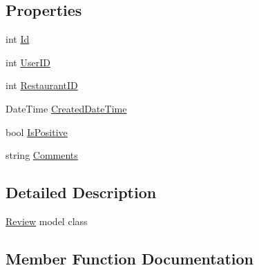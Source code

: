 \subsection*{Properties}
\begin{DoxyCompactItemize}
\item 
int \hyperlink{class_restaurant_reviews_1_1_data_1_1_review_a4226eaf109005a38ea25e2325759616e}{Id}
\item 
int \hyperlink{class_restaurant_reviews_1_1_data_1_1_review_a61b089604a847d3137f398e711c8fecd}{User\+ID}
\item 
int \hyperlink{class_restaurant_reviews_1_1_data_1_1_review_a7684403f30d07e4fc84a235940d9d5f1}{Restaurant\+ID}
\item 
Date\+Time \hyperlink{class_restaurant_reviews_1_1_data_1_1_review_a82fe5d1077e5dfcf115bf6530d3030f9}{Created\+Date\+Time}
\item 
bool \hyperlink{class_restaurant_reviews_1_1_data_1_1_review_a53f6a32aa99be61ab67ff942826a0a80}{Is\+Positive}
\item 
string \hyperlink{class_restaurant_reviews_1_1_data_1_1_review_a0c4351d03351e10d546c6d52d697a271}{Comments}
\end{DoxyCompactItemize}


\subsection{Detailed Description}
\hyperlink{class_restaurant_reviews_1_1_data_1_1_review}{Review} model class 



\subsection{Member Function Documentation}
